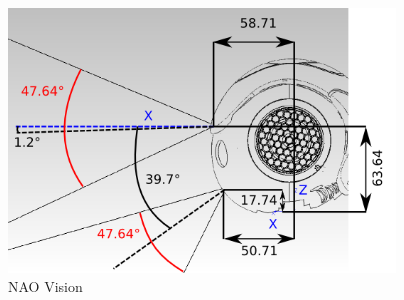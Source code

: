 \begin{figure}
	[h] \centering 
	\includegraphics[height=7cm]{figures/content/nao-vision.png} 
	\caption{NAO Vision}
	\label{fg:nao:vision} 
\end{figure}